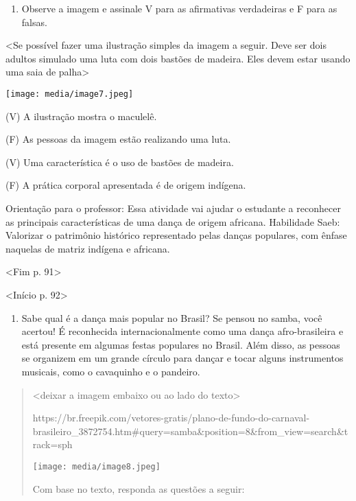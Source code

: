 \begin{enumerate}
\def\labelenumi{\arabic{enumi}.}
\item
  Observe a imagem e assinale V para as afirmativas verdadeiras e F para
  as falsas.
\end{enumerate}

\textless{}Se possível fazer uma ilustração simples da imagem a seguir.
Deve ser dois adultos simulado uma luta com dois bastões de madeira.
Eles devem estar usando uma saia de palha\textgreater{}

\texttt{[image: media/image7.jpeg]}

(V) A ilustração mostra o maculelê.

(F) As pessoas da imagem estão realizando uma luta.

(V) Uma característica é o uso de bastões de madeira.

(F) A prática corporal apresentada é de origem indígena.

Orientação para o professor: Essa atividade vai ajudar o estudante a
reconhecer as principais características de uma dança de origem
africana. Habilidade Saeb: Valorizar o patrimônio histórico representado
pelas danças populares, com ênfase naquelas de matriz indígena e
africana.

\textless{}Fim p. 91\textgreater{}

\textless{}Início p. 92\textgreater{}

\begin{enumerate}
\def\labelenumi{\arabic{enumi}.}
\item
  Sabe qual é a dança mais popular no Brasil? Se pensou no samba, você
  acertou! É reconhecida internacionalmente como uma dança
  afro-brasileira e está presente em algumas festas populares no Brasil.
  Além disso, as pessoas se organizem em um grande círculo para dançar e
  tocar alguns instrumentos musicais, como o cavaquinho e o pandeiro.
\end{enumerate}

\begin{quote}
\textless{}deixar a imagem embaixo ou ao lado do texto\textgreater{}

https://br.freepik.com/vetores-gratis/plano-de-fundo-do-carnaval-brasileiro\_3872754.htm\#query=samba\&position=8\&from\_view=search\&track=sph

\texttt{[image: media/image8.jpeg]}

Com base no texto, responda as questões a seguir:
\end{quote}

